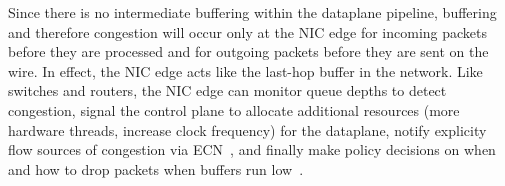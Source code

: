  Since there is no
intermediate buffering within the dataplane pipeline, buffering and
therefore congestion will occur only at the NIC edge for incoming
packets before they are processed and for outgoing packets before they
are sent on the wire.  In effect, the NIC edge acts like the last-hop
buffer in the network.  Like switches and routers, the NIC edge can
monitor queue depths to detect congestion, signal the control plane to
allocate additional resources (more hardware threads, increase clock
frequency) for the dataplane, notify explicity flow sources of
congestion via ECN~\cite{ramakrishnan2001addition}, and finally make
policy decisions on when and how to drop packets when buffers run
low~\cite{DBLP:journals/ton/FloydJ93}.
